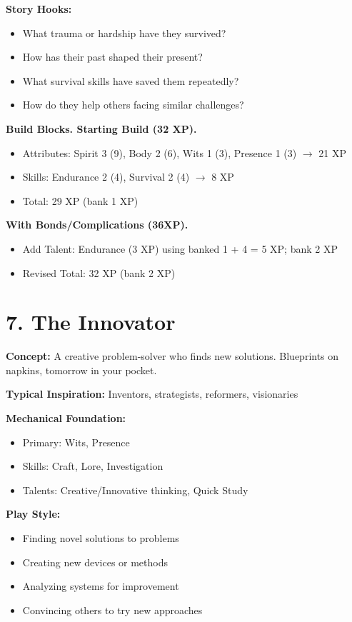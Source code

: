 \documentclass[11pt,twoside,openany]{book}
\begin{document}
\textbf{Story Hooks:}
\begin{itemize}
\item What trauma or hardship have they survived?
\item How has their past shaped their present?
\item What survival skills have saved them repeatedly?
\item How do they help others facing similar challenges?
\end{itemize}

\textbf{Build Blocks. Starting Build (32 XP).}
\begin{itemize}
\item Attributes: Spirit 3 (9), Body 2 (6), Wits 1 (3), Presence 1 (3) $\rightarrow$ 21 XP
\item Skills: Endurance 2 (4), Survival 2 (4) $\rightarrow$ 8 XP
\item Total: 29 XP (bank 1 XP)
\end{itemize}

\textbf{With Bonds/Complications (36XP).}
\begin{itemize}
\item Add Talent: Endurance (3 XP) using banked 1 + 4 = 5 XP; bank 2 XP
\item Revised Total: 32 XP (bank 2 XP)
\end{itemize}

\section*{7. The Innovator} 

\textbf{Concept:} A creative problem-solver who finds new solutions. Blueprints on napkins, tomorrow in your pocket.

\textbf{Typical Inspiration:} Inventors, strategists, reformers, visionaries

\textbf{Mechanical Foundation:}
\begin{itemize}
\item Primary: Wits, Presence
\item Skills: Craft, Lore, Investigation
\item Talents: Creative/Innovative thinking, Quick Study
\end{itemize}

\textbf{Play Style:}
\begin{itemize}
\item Finding novel solutions to problems
\item Creating new devices or methods
\item Analyzing systems for improvement
\item Convincing others to try new approaches
\end{itemize}
\end{document}
